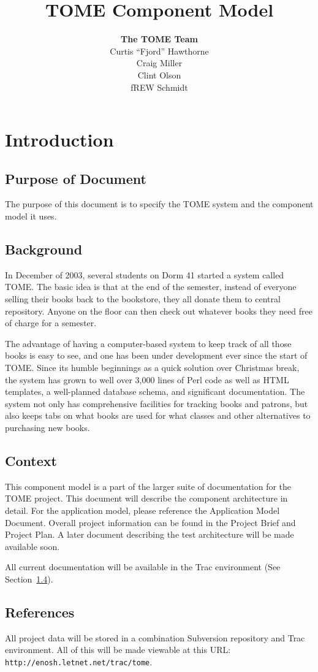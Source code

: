 \documentclass[12pt,titlepage]{article}
\author{\textbf{The TOME Team}\\
Curtis ``Fjord'' Hawthorne \\
Craig Miller\\
Clint Olson\\
fREW Schmidt
}
\title{\textbf{TOME Component Model}}
\begin{document}
\maketitle
\tableofcontents
\listoffigures
\newpage
\sloppy
\section{Introduction}
\subsection{Purpose of Document}
The purpose of this document is to specify the TOME system and the component model it uses.

\subsection{Background}
In December of 2003, several students on Dorm 41 started a system called TOME.  The basic idea is that at the end of the semester, instead of everyone selling their books back to the bookstore, they all donate them to central repository.  Anyone on the floor can then check out whatever books they need free of charge for a semester.

The advantage of having a computer-based system to keep track of all those books is easy to see, and one has been under development ever since the start of TOME.  Since its humble beginnings as a quick solution over Christmas break, the system has grown to well over 3,000 lines of Perl code as well as HTML templates, a well-planned database schema, and significant documentation.  The system not only has comprehensive facilities for tracking books and patrons, but also keeps tabs on what books are used for what classes and other alternatives to purchasing new books.
\subsection{Context}
This component model is a part of the larger suite of documentation for the TOME project.  This document will describe the component architecture in detail.  For the application model, please reference the Application Model Document.  Overall project information can be found in the Project Brief and Project Plan.  A later document describing the test architecture will be made available soon.

All current documentation will be available in the Trac environment (See Section~\ref{references}).
\subsection{References}
\label{references}
All project data will be stored in a combination Subversion repository and Trac environment.  All of this will be made viewable at this URL: \texttt{http://enosh.letnet.net/trac/tome}.
\end{document}
